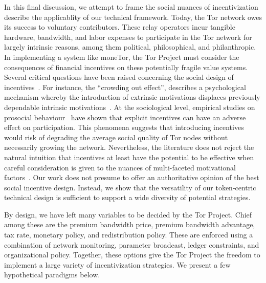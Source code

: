 

In this final discussion, we attempt to frame the social nuances of
incentivization describe the applicablity of our technical framework. Today, the
Tor network owes its success to voluntary contributors. These relay operators
incur tangible hardware, bandwidth, and labor expenses to participate in the Tor network for
largely intrinsic reasons, among them political, philosophical, and
philanthropic. In implementing a system like moneTor, the Tor Project must
consider the consequences of financial incentives on these potentially
fragile value systems. Several critical questions have been raised concerning
the social design of incentives~\cite{jansenblogpost}. For instance, the
``crowding out effect'', describes a psychological mechanism whereby the
introduction of extrinsic motivations displaces previously dependable intrinsic
motivations~\cite{10.1257/jep.25.4.191}. At the sociological level, empirical
studies on prosocial behaviour~\cite{10.1257/aer.96.5.1652} have shown that
explicit incentives can have an adverse effect on participation. This phenomena
suggests that introducing incentives would risk of degrading the average social
quality of Tor nodes without necessarily growing the network. Nevertheless, the
literature does not reject the natural intuition that incentives at least have
the potential to be effective when careful consideration is given to the nuances
of multi-faceted motivational factors~\cite{10.1257/aer.96.5.1652}. Our work
does not presume to offer an authoritative opinion of the best social incentive
design. Instead, we show that the versatility of our token-centric technical
design is sufficient to support a wide diversity of potential strategies.

By design, we have left many variables to be decided by the Tor Project. Chief
among these are the premium bandwidth price, premium bandwidth advantage, tax
rate, monetary policy, and redistribution policy. These are enforced using a
combination of network monitoring, parameter broadcast, ledger constraints, and
organizational policy. Together, these options give the Tor Project the freedom
to implement a large variety of incentivization strategies. We present a few
hypothetical paradigms below.


